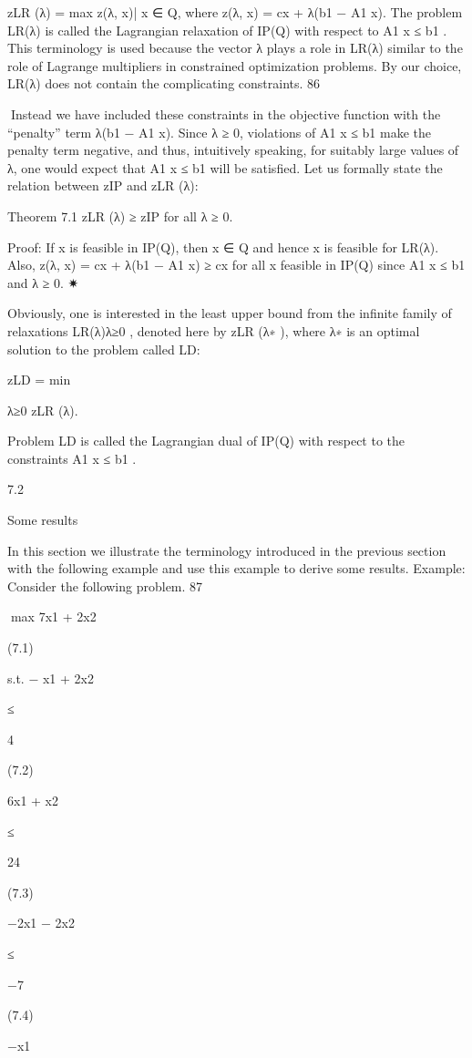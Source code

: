zLR (λ) = max {z(λ, x)| x ∈ Q}, where z(λ, x) = cx + λ(b1 − A1 x).
The problem LR(λ) is called the Lagrangian relaxation of IP(Q) with respect to A1 x ≤ b1 . This terminology is used because the vector λ plays a role in LR(λ) similar to the role of Lagrange multipliers in
constrained optimization problems. By our choice, LR(λ) does not contain the complicating constraints.
86

Instead we have included these constraints in the objective function with the “penalty” term λ(b1 − A1 x).
Since λ ≥ 0, violations of A1 x ≤ b1 make the penalty term negative, and thus, intuitively speaking, for
suitably large values of λ, one would expect that A1 x ≤ b1 will be satisfied.
Let us formally state the relation between zIP and zLR (λ):

Theorem 7.1 zLR (λ) ≥ zIP for all λ ≥ 0.

Proof: If x is feasible in IP(Q), then x ∈ Q and hence x is feasible for LR(λ). Also, z(λ, x) = cx + λ(b1 −
A1 x) ≥ cx for all x feasible in IP(Q) since A1 x ≤ b1 and λ ≥ 0.
✷

Obviously, one is interested in the least upper bound from the infinite family of relaxations {LR(λ)}λ≥0 ,
denoted here by zLR (λ∗ ), where λ∗ is an optimal solution to the problem called LD:

zLD = min

λ≥0 zLR (λ).

Problem LD is called the Lagrangian dual of IP(Q) with respect to the constraints A1 x ≤ b1 .

7.2

Some results

In this section we illustrate the terminology introduced in the previous section with the following example
and use this example to derive some results.
Example: Consider the following problem.
87

max 7x1 + 2x2

(7.1)

s.t. − x1 + 2x2

≤

4

(7.2)

6x1 + x2

≤

24

(7.3)

−2x1 − 2x2

≤

−7

(7.4)

−x1

